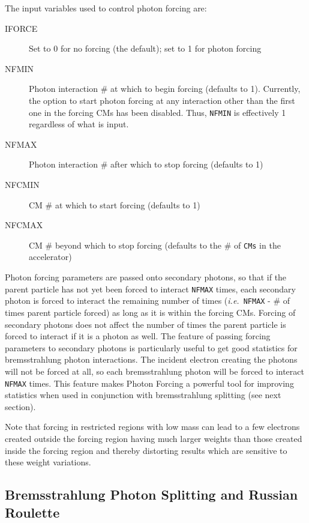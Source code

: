 \documentclass[12pt,twoside]{article}
\newcommand{\ie}{{\em i.e.}}
\begin{document}
The input variables used to control photon forcing are:
\begin{description}
\item [IFORCE] Set to 0 for no forcing (the default); set to 1 for photon
forcing
\item [NFMIN] Photon interaction \# at which to begin forcing (defaults to 1).
Currently, the option to start photon forcing at any interaction other than the
first one in the forcing CMs has been disabled.  Thus, {\tt NFMIN} is
effectively 1 regardless of what is input.
\item [NFMAX] Photon interaction \# after which to stop forcing (defaults to 1)
\item [NFCMIN] CM \# at which to start forcing (defaults to 1)
\item [NFCMAX] CM \# beyond which to stop forcing (defaults
to the \# of  \verb+CMs+ in the accelerator)

\end{description}
 

Photon forcing parameters are passed onto secondary photons, so that
if the parent particle has not yet been forced to interact {\tt NFMAX}
times, each secondary photon is forced to interact the remaining number
of times (\ie\ {\tt NFMAX} - \# of times parent particle forced) as long
as it is within the forcing CMs.  Forcing of secondary photons does not
affect the number of times the parent particle is forced to interact
if it is a photon as well.  The feature of passing forcing parameters
to secondary photons is particularly useful to get good statistics for
bremsstrahlung photon interactions.  The incident electron creating the
photons will not be forced at all, so each bremsstrahlung photon will be
forced to interact {\tt NFMAX} times.  This feature makes Photon Forcing
a powerful tool for improving statistics when used in conjunction with
bremsstrahlung splitting (see next section).

Note that forcing in restricted regions with low mass can lead to a few
electrons created outside the forcing region having much larger weights than
those created inside the forcing region and thereby distorting results
which are sensitive to these weight variations.

\subsection[Brem Splitting and Russian Roulette]
               {Bremsstrahlung Photon Splitting and Russian Roulette}
\label{bremsection}
\end{document}
